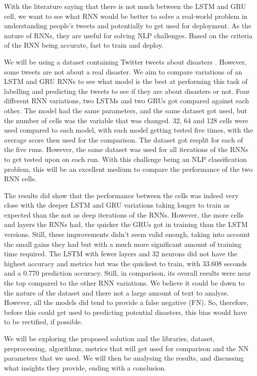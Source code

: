 \documentclass[a4paper,10pt]{article}
\begin{document}
	With the literature saying that there is not much between the LSTM and GRU cell, we want to see what RNN would be better to solve a real-world problem in understanding people's tweets and potentially to get used for deployment. As the nature of RNNs, they are useful for solving NLP challenges. Based on the criteria of the RNN being accurate, fast to train and deploy.

	We will be using a dataset containing Twitter tweets about disasters \cite{disater_kaggle}. However, some tweets are not about a real disaster. We aim to compare variations of an LSTM and GRU RNNs to see what model is the best at performing this task of labelling and predicting the tweets to see if they are about disasters or not. Four different RNN variations, two LSTMs and two GRUs got compared against each other. The model had the same parameters, and the same dataset got used, but the number of cells was the variable that was changed. 32, 64 and 128 cells were used compared to each model, with each model getting tested five times, with the average score then used for the comparison. The dataset got resplit for each of the five runs. However, the same dataset was used for all iterations of the RNNs to get tested upon on each run. With this challenge being an NLP classification problem, this will be an excellent medium to compare the performance of the two RNN cells. 
	
	The results did show that the performance between the cells was indeed very close with the deeper LSTM and GRU variations taking longer to train as expected than the not as deep iterations of the RNNs. However, the more cells and layers the RNNs had, the quicker the GRUs got in training than the LSTM versions. Still, these improvements didn't seem valid enough, taking into account the small gains they had but with a much more significant amount of training time required. The LSTM with fewer layers and 32 neurons did not have the highest accuracy and metrics but was the quickest to train, with 33.608 seconds and a 0.770 prediction accuracy. Still, in comparison, its overall results were near the top compared to the other RNN variations. We believe it could be down to the nature of the dataset and there not a large amount of text to analyse. However, all the models did tend to provide a false negative (FN). So, therefore, before this could get used to predicting potential disasters, this bias would have to be rectified, if possible.

	We will be exploring the proposed solution and the libraries, dataset, preprocessing, algorithms, metrics that will get used for comparison and the NN parameters that we used. We will then be analysing the results, and discussing what insights they provide, ending with a conclusion.
\end{document}
